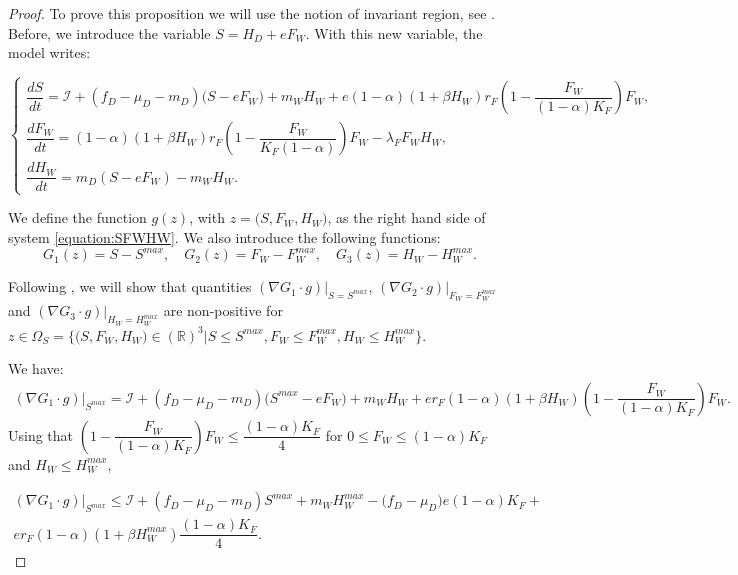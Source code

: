 \documentclass{article}
\newcommand{\lfw}{\lambda_{F}}
\newcommand{\lfw}{\lambda_{F}}
\newcommand{\cI}{\mathcal{I}}
\theoremstyle{definition}
\theoremstyle{remark}
\begin{document}
\begin{proof} 
To prove this proposition we will use the notion of invariant region, see \cite{smoller_shock_1994}. Before, we introduce the variable $S = H_D + e F_W$. 
%
With this new variable, the model writes:

\begin{equation}
\left\{ \begin{array}{l}
\dfrac{dS}{dt} = \cI + (f_D - \mu_D - m_D) \Big(S - eF_W \Big) + m_WH_W + e (1-\alpha)(1+\beta H_W)r_F  \left(1 - \dfrac{F_W}{(1-\alpha)K_F} \right) F_W, \\
\dfrac{dF_W}{dt} = (1-\alpha)(1+\beta H_W) r_F \left(1 - \dfrac{F_W}{K_F(1-\alpha)} \right) F_W - \lfw F_W H_W, \\
\dfrac{dH_W}{dt}= m_D \left(S - eF_W\right) - m_W H_W.
\end{array} \right.
\label{equation:SFWHW}
\end{equation}


We define the function $g(z)$, with $z=\Big(S, F_W, H_W \Big)$, as the right hand side of system \eqref{equation:SFWHW}. We also introduce the following functions:
$$
G_1(z) = S - S^{max},
\quad
G_2(z) = F_W - F_W^{max},
\quad
G_3(z) = H_W - H_W^{max}.
$$

Following \cite{smoller_shock_1994}, we will show that quantities $(\nabla G_1 \cdot g)|_{S = S^{max}}$, $(\nabla G_2 \cdot g)|_{F_W = F_W^{max}}$ and $(\nabla G_3 \cdot g)|_{H_W = H_W^{max}}$ are non-positive for $z \in \Omega_S = \Big\{ \Big(S, F_W, H_W \Big) \in (\mathbb{R})^3  \Big|S \leq S^{max}, F_W \leq F_W^{max}, H_W \leq H_W^{max} \Big\}$.

We have:
\begin{multline*}
(\nabla G_1 \cdot g)|_{S^{max}} = \cI + (f_D - \mu_D -m_D) \Big(S^{max} - eF_W \Big) +m_WH_W + e r_F(1-\alpha)(1+\beta H_W)  \left(1 - \dfrac{F_W}{(1-\alpha)K_F} \right) F_W.
\end{multline*}
Using that $\left(1-\dfrac{F_W}{(1-\alpha)K_F}\right) F_W \leq \dfrac{(1-\alpha)K_F}{4}$ for $0\leq F_W \leq (1-\alpha)K_F$ and $H_W \leq H_W^{max}$,

\begin{multline*}
(\nabla G_1 \cdot g)|_{S^{max}} \leq \cI + (f_D - \mu_D - m_D) S^{max} + m_W H_W^{max} - \Big(f_D - \mu_D \Big) e(1-\alpha)K_F + \\ er_F (1-\alpha)(1+\beta H_W^{max}) \dfrac{(1-\alpha)K_F}{4}.
\end{multline*}


\end{proof}
\end{document}

